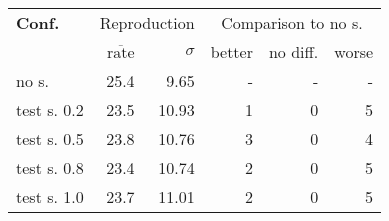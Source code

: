 \begin{tabular}{ l r r | r r r }
\hline 
\textbf{Conf.} & \multicolumn{2}{c|}{Reproduction} & \multicolumn{3}{c}{Comparison to no s.} \\ 
  & $\overline{\text{rate}}$ & $\sigma$ & better & no diff. & worse \\ 
\hline 
no s. & 25.4 & 9.65 & - & - & - \\ 
test s. 0.2 & 23.5 & 10.93 & 1 & 0 & 5 \\ 
test s. 0.5 & 23.8 & 10.76 & 3 & 0 & 4 \\ 
test s. 0.8 & 23.4 & 10.74 & 2 & 0 & 5 \\ 
test s. 1.0 & 23.7 & 11.01 & 2 & 0 & 5 \\ 
\hline 
\end{tabular}